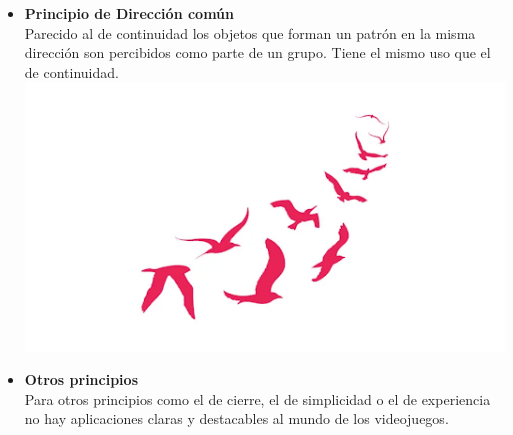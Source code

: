 \begin{itemize}
\item \textbf{Principio de Dirección común} \\
Parecido al de continuidad los objetos que forman un patrón en la misma dirección son percibidos como parte de un grupo. Tiene el mismo uso que el de continuidad.
\includegraphics[width=\textwidth]{Imagenes/EjemploDireccionComun.png}

\item \textbf{Otros principios}\\
Para otros principios como el de cierre, el de simplicidad o el de experiencia no hay aplicaciones claras y destacables al mundo de los videojuegos.
\end{itemize}
